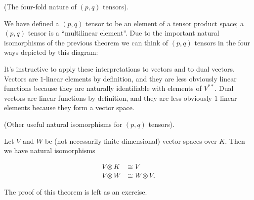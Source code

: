 \begin{remark}
    (The four-fold nature of $(p, q)$ tensors).
    
    We have defined a $(p, q)$ tensor to be an element of a tensor product space; a $(p, q)$ tensor is a ``multilinear element''. Due to the important natural isomorphisms of the previous theorem we can think of $(p, q)$ tensors in the four ways depicted by this diagram:
    
    \begin{center}
    \end{center}
    
    It's instructive to apply these interpretations to vectors and to dual vectors. Vectors are $1$-linear elements by definition, and they are less obviously linear functions because they are naturally identifiable with elements of $V^{**}$. Dual vectors are linear functions by definition, and they are less obviously $1$-linear elements because they form a vector space.
\end{remark}

\begin{theorem}
    (Other useful natural isomorphisms for $(p, q)$ tensors).

    Let $V$ and $W$ be (not necessarily finite-dimensional) vector spaces over $K$. Then we have natural isomorphisms

     \begin{align*}
         V \otimes K &\cong V \\
         V \otimes W &\cong W \otimes V.
     \end{align*}
     
     The proof of this theorem is left as an exercise.
\end{theorem}

